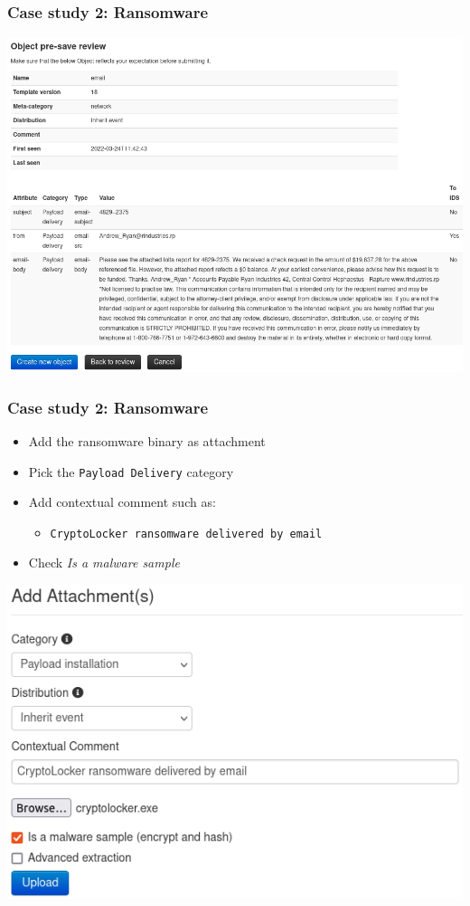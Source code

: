 \begin{frame}
    \frametitle{Case study 2: Ransomware}
    \begin{center}
        \includegraphics[width=0.9\linewidth]{pictures/case2/object-mail.png}
    \end{center}
\end{frame}

\begin{frame}
    \frametitle{Case study 2: Ransomware}
    \begin{itemize}
        \item Add the ransomware binary as attachment
        \item Pick the \texttt{Payload Delivery} category
        \item Add contextual comment such as:
        \begin{itemize}
            \item \texttt{CryptoLocker ransomware delivered by email}
        \end{itemize}
        \item Check \textit{Is a malware sample}
    \end{itemize}
    \begin{center}
        \includegraphics[width=0.70\linewidth]{pictures/case2/attribute-bin.png}
    \end{center}
\end{frame}

